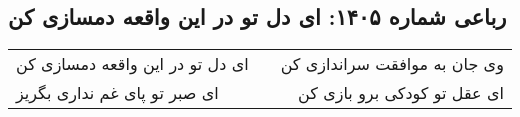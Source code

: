 \begin{center}
\section*{رباعی شماره ۱۴۰۵: ای دل تو در این واقعه دمسازی کن}
\label{sec:1405}
\begin{longtable}{l p{0.5cm} r}
ای دل تو در این واقعه دمسازی کن
&&
وی جان به موافقت سراندازی کن
\\
ای صبر تو پای غم نداری بگریز
&&
ای عقل تو کودکی برو بازی کن
\\
\end{longtable}
\end{center}
